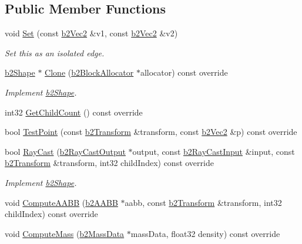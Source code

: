 \subsection*{Public Member Functions}
\begin{DoxyCompactItemize}
\item 
\mbox{\label{classb2_edge_shape_a67dd3b17630a600033cb4380697a4e9d}} 
void \hyperlink{classb2_edge_shape_a67dd3b17630a600033cb4380697a4e9d}{Set} (const \hyperlink{structb2_vec2}{b2\+Vec2} \&v1, const \hyperlink{structb2_vec2}{b2\+Vec2} \&v2)
\begin{DoxyCompactList}\small\item\em Set this as an isolated edge. \end{DoxyCompactList}\item 
\mbox{\label{classb2_edge_shape_a52ed696717f44ed02b7a88ccf201563c}} 
\hyperlink{classb2_shape}{b2\+Shape} $\ast$ \hyperlink{classb2_edge_shape_a52ed696717f44ed02b7a88ccf201563c}{Clone} (\hyperlink{classb2_block_allocator}{b2\+Block\+Allocator} $\ast$allocator) const override
\begin{DoxyCompactList}\small\item\em Implement \hyperlink{classb2_shape}{b2\+Shape}. \end{DoxyCompactList}\item 
int32 \hyperlink{classb2_edge_shape_ae9dcaa2f4b77fcf182d29159658da82a}{Get\+Child\+Count} () const override
\item 
bool \hyperlink{classb2_edge_shape_a15151673cf9ad585779c70363425f470}{Test\+Point} (const \hyperlink{structb2_transform}{b2\+Transform} \&transform, const \hyperlink{structb2_vec2}{b2\+Vec2} \&p) const override
\item 
\mbox{\label{classb2_edge_shape_a192cf10bd556a5a90b29a2bcee2ddd75}} 
bool \hyperlink{classb2_edge_shape_a192cf10bd556a5a90b29a2bcee2ddd75}{Ray\+Cast} (\hyperlink{structb2_ray_cast_output}{b2\+Ray\+Cast\+Output} $\ast$output, const \hyperlink{structb2_ray_cast_input}{b2\+Ray\+Cast\+Input} \&input, const \hyperlink{structb2_transform}{b2\+Transform} \&transform, int32 child\+Index) const override
\begin{DoxyCompactList}\small\item\em Implement \hyperlink{classb2_shape}{b2\+Shape}. \end{DoxyCompactList}\item 
void \hyperlink{classb2_edge_shape_a238139ae1736b457d77443133ff16854}{Compute\+A\+A\+BB} (\hyperlink{structb2_a_a_b_b}{b2\+A\+A\+BB} $\ast$aabb, const \hyperlink{structb2_transform}{b2\+Transform} \&transform, int32 child\+Index) const override
\item 
void \hyperlink{classb2_edge_shape_ac738c1e0ab2f4dfbab26e3942efa60af}{Compute\+Mass} (\hyperlink{structb2_mass_data}{b2\+Mass\+Data} $\ast$mass\+Data, float32 density) const override
\end{DoxyCompactItemize}

